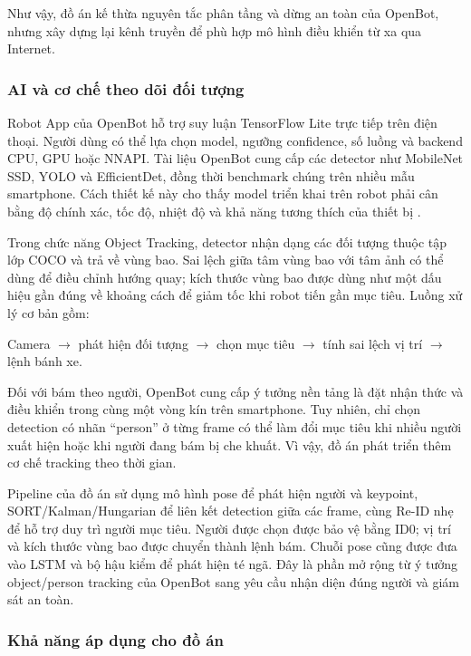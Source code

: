 Như vậy, đồ án kế thừa nguyên tắc phân tầng và dừng an toàn của OpenBot, nhưng xây dựng lại kênh truyền để phù hợp mô hình điều khiển từ xa qua Internet.

\subsubsection{AI và cơ chế theo dõi đối tượng}

Robot App của OpenBot hỗ trợ suy luận TensorFlow Lite trực tiếp trên điện thoại. Người dùng có thể lựa chọn model, ngưỡng confidence, số luồng và backend CPU, GPU hoặc NNAPI. Tài liệu OpenBot cung cấp các detector như MobileNet SSD, YOLO và EfficientDet, đồng thời benchmark chúng trên nhiều mẫu smartphone. Cách thiết kế này cho thấy model triển khai trên robot phải cân bằng độ chính xác, tốc độ, nhiệt độ và khả năng tương thích của thiết bị .

Trong chức năng Object Tracking, detector nhận dạng các đối tượng thuộc tập lớp COCO và trả về vùng bao. Sai lệch giữa tâm vùng bao với tâm ảnh có thể dùng để điều chỉnh hướng quay; kích thước vùng bao được dùng như một dấu hiệu gần đúng về khoảng cách để giảm tốc khi robot tiến gần mục tiêu. Luồng xử lý cơ bản gồm:

\begin{center}
Camera $\rightarrow$ phát hiện đối tượng $\rightarrow$ chọn mục tiêu $\rightarrow$ tính sai lệch vị trí $\rightarrow$ lệnh bánh xe.
\end{center}

Đối với bám theo người, OpenBot cung cấp ý tưởng nền tảng là đặt nhận thức và điều khiển trong cùng một vòng kín trên smartphone. Tuy nhiên, chỉ chọn detection có nhãn ``person'' ở từng frame có thể làm đổi mục tiêu khi nhiều người xuất hiện hoặc khi người đang bám bị che khuất. Vì vậy, đồ án phát triển thêm cơ chế tracking theo thời gian.

Pipeline của đồ án sử dụng mô hình pose để phát hiện người và keypoint, SORT/Kalman/Hungarian để liên kết detection giữa các frame, cùng Re-ID nhẹ để hỗ trợ duy trì người mục tiêu. Người được chọn được bảo vệ bằng ID0; vị trí và kích thước vùng bao được chuyển thành lệnh bám. Chuỗi pose cũng được đưa vào LSTM và bộ hậu kiểm để phát hiện té ngã. Đây là phần mở rộng từ ý tưởng object/person tracking của OpenBot sang yêu cầu nhận diện đúng người và giám sát an toàn.

\subsubsection{Khả năng áp dụng cho đồ án}

